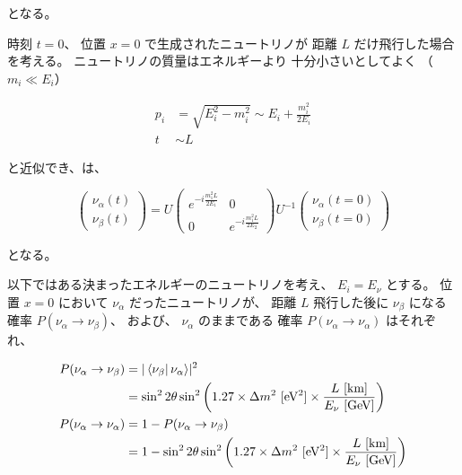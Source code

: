 となる。

時刻 $t=0$、
位置 $x=0$ で生成されたニュートリノが
距離 $L$ だけ飛行した場合を考える。
ニュートリノの質量はエネルギーより
十分小さいとしてよく
（$m_{i} \ll E_{i}$）

\begin{align}
    p_{i} & = \sqrt{E_{i}^{2}-m_{i}^{2}} \sim E_{i} + \frac{m_{i}^{2}}{2E_{i}}\\
    t & \sim L
\end{align}

と近似でき、は、

\begin{equation}
    \begin{pmatrix}
        \nu_{\alpha}(t)\\
        \nu_{\beta}(t)
    \end{pmatrix}
    = U
    \begin{pmatrix}
        e^{-i\frac{m_{1}^{2}L}{2E_{1}}} & 0\\
        0 & e^{-i\frac{m_{1}^{2}L}{2E_{2}}}
    \end{pmatrix}
    U^{-1}
    \begin{pmatrix}
        \nu_{\alpha}(t=0)\\
        \nu_{\beta}(t=0)
    \end{pmatrix}
\end{equation}

となる。

以下ではある決まったエネルギーのニュートリノを考え、
$E_{i} = E_{\nu}$ とする。
位置 $x=0$ において $\nu_{\alpha}$ だったニュートリノが、
距離 $L$ 飛行した後に $\nu_{\beta}$ になる
確率 $P(\nu_{\alpha} \rightarrow \nu_{\beta})$、
および、 $\nu_{\alpha}$ のままである
確率 $P(\nu_{\alpha} \rightarrow \nu_{\alpha})$ はそれぞれ、

\begin{align}
    P(\nu_{\alpha} \rightarrow \nu_{\beta}) & = |\bra{\nu_{\beta}}\nu_{\alpha}\rangle|^{2} \nonumber\\
    & = \sin^{2}2\theta\sin^{2}\left(1.27\times \Delta m^{2}\ \mathrm{[eV^{2}]}\times \frac{L\ \mathrm{[km]}}{E_{\nu}\ \mathrm{[GeV]}}\right) \label{nuchange}\\
    P(\nu_{\alpha} \rightarrow \nu_{\alpha}) & = 1 - P(\nu_{\alpha}\rightarrow \nu_{\beta}) \nonumber \\
    & = 1 - \sin^{2}2\theta\sin^{2}\left(1.27 \times \Delta m^{2}\ \mathrm{[eV^{2}]} \times \frac{L\ \mathrm{[km]}}{E_{\nu}\ \mathrm{[GeV]}}\right) \label{nuunchange}
\end{align}

